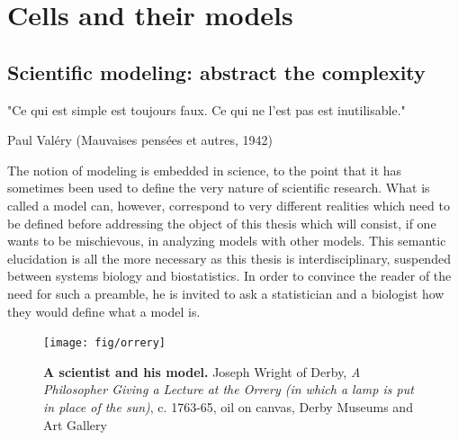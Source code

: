 \documentclass[a4paper,12pt,twoside,onecolumn,openright,final,oldfontcommands]{memoir}
\newcommand{\initial}[1]{
	\lettrine[lines=3,lhang=0.33,nindent=0em]{
		\color{gray}
     		{\textsc{#1}}}{}}
\newcommand\blankpage{%
    \null
    \thispagestyle{empty}%
    \newpage
    }
\begin{document}
\tableofcontents*
{}
\newpage

\listoftables
{}
\newpage

\listoffigures
{}
\newpage

\blankpage


\part{Cells and their
models}\label{part-cells-and-their-models}

\chapter{Scientific modeling: abstract the
complexity}\label{scientific-modeling-abstract-the-complexity}

\epigraph{"Ce qui est simple est toujours faux. Ce qui ne l'est pas est inutilisable."}{Paul Valéry (Mauvaises pensées et autres, 1942)}

\initial{T}he notion of modeling is embedded in science, to the point
that it has sometimes been used to define the very nature of scientific
research. What is called a model can, however, correspond to very
different realities which need to be defined before addressing the
object of this thesis which will consist, if one wants to be
mischievous, in analyzing models with other models. This semantic
elucidation is all the more necessary as this thesis is
interdisciplinary, suspended between systems biology and biostatistics.
In order to convince the reader of the need for such a preamble, he is
invited to ask a statistician and a biologist how they would define what
a model is.

\begin{figure}

{\centering \texttt{[image: fig/orrery]} 

}

\caption[A scientist and his model]{\textbf{A scientist and his model.} Joseph Wright
of Derby, \emph{A Philosopher Giving a Lecture at the Orrery (in which a
lamp is put in place of the sun)}, c. 1763-65, oil on canvas, Derby
Museums and Art Gallery}\label{fig:orrery}
\end{figure}
\end{document}
